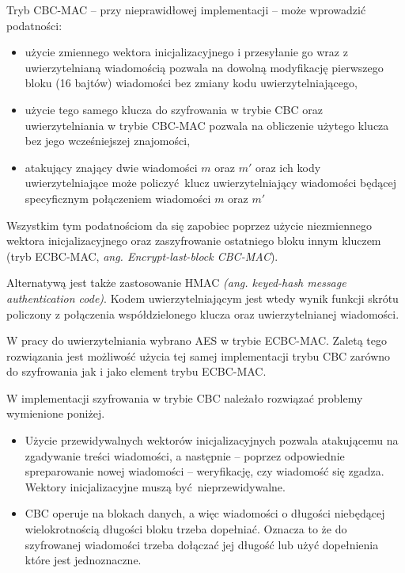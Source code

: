 Tryb CBC-MAC -- przy nieprawidłowej implementacji -- może wprowadzić podatności:

\begin{itemize}
    \item użycie zmiennego wektora inicjalizacyjnego i przesyłanie go wraz z uwierzytelnianą wiadomością pozwala na dowolną modyfikację pierwszego bloku (16 bajtów) wiadomości bez zmiany kodu uwierzytelniającego,
    \item użycie tego samego klucza do szyfrowania w trybie CBC oraz uwierzytelniania w trybie CBC-MAC pozwala na obliczenie użytego klucza bez jego wcześniejszej znajomości,
    \item atakujący znający dwie wiadomości $ m $ oraz $ m' $ oraz ich kody uwierzytelniające może policzyć klucz uwierzytelniający wiadomości będącej specyficznym połączeniem wiadomości $ m $ oraz $ m' $
\end{itemize}

Wszystkim tym podatnościom da się zapobiec poprzez użycie niezmiennego wektora inicjalizacyjnego oraz zaszyfrowanie ostatniego bloku innym kluczem (tryb ECBC-MAC, {\itshape ang. Encrypt-last-block CBC-MAC}).

Alternatywą jest także zastosowanie HMAC {\itshape (ang. keyed-hash message authentication code)}. Kodem uwierzytelniającym jest wtedy wynik funkcji skrótu policzony z połączenia współdzielonego klucza oraz uwierzytelnianej wiadomości.

W pracy do uwierzytelniania wybrano AES w trybie ECBC-MAC. Zaletą tego rozwiązania jest możliwość użycia tej samej implementacji trybu CBC zarówno do szyfrowania jak i jako element trybu ECBC-MAC.

W implementacji szyfrowania w trybie CBC należało rozwiązać problemy wymienione poniżej.

\begin{itemize}
    \item Użycie przewidywalnych wektorów inicjalizacyjnych pozwala atakującemu na zgadywanie treści wiadomości, a następnie -- poprzez odpowiednie spreparowanie nowej wiadomości -- weryfikację, czy wiadomość się zgadza. Wektory inicjalizacyjne muszą być nieprzewidywalne.
    \item CBC operuje na blokach danych, a więc wiadomości o długości niebędącej wielokrotnością długości bloku trzeba dopełniać. Oznacza to że do szyfrowanej wiadomości trzeba dołączać jej długość lub użyć dopełnienia które jest jednoznaczne.
\end{itemize}
